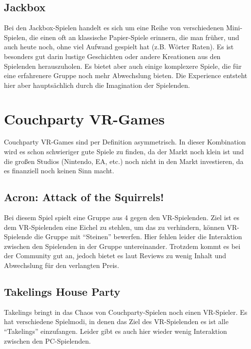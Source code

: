 \subsection{Jackbox}
Bei den Jackbox-Spielen handelt es sich um eine Reihe von verschiedenen Mini-Spielen, die einen oft an klassische Papier-Spiele erinnern, die man früher, und auch heute noch, ohne viel Aufwand gespielt hat (z.B. Wörter Raten). Es ist besonders gut darin lustige Geschichten oder andere Kreationen aus den Spielenden herauszuholen. Es bietet aber auch einige komplexere Spiele, die für eine erfahrenere Gruppe noch mehr Abwechslung bieten. Die Experience entsteht hier aber hauptsächlich durch die Imagination der Spielenden.

\section{Couchparty VR-Games}

Couchparty VR-Games sind per Definition asymmetrisch. In dieser Kombination wird es schon schwieriger gute Spiele zu finden, da der Markt noch klein ist und die großen Studios (Nintendo, EA, etc.) noch nicht in den Markt investieren, da es finanziell noch keinen Sinn macht.

\subsection{Acron: Attack of the Squirrels!}
Bei diesem Spiel spielt eine Gruppe aus 4 gegen den VR-Spielenden. Ziel ist es dem VR-Spielenden eine Eichel zu stehlen, um das zu verhindern, können VR-Spielende die Gruppe mit "`Steinen"' bewerfen. Hier fehlen leider die Interaktion zwischen den Spielenden in der Gruppe untereinander. Trotzdem kommt es bei der Community gut an, jedoch bietet es laut Reviews zu wenig Inhalt und Abwechslung für den verlangten Preis\cite{_acron_reviews}.

\subsection{Takelings House Party}
Takelings bringt in das Chaos von Couchparty-Spielen noch einen VR-Spieler. Es hat verschiedene Spielmodi, in denen das Ziel des VR-Spielenden es ist alle "`Takelings"' einzufangen. Leider gibt es auch hier wieder wenig Interaktion zwischen den PC-Spielenden.